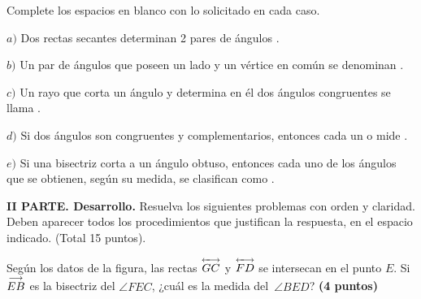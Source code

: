 \documentclass[12pt, fleqn]{article}
\begin{document}
\pagebreak

\hspace{-1cm}
\item Complete los espacios en blanco con lo solicitado en cada caso. \vs

\hspace{-1cm}
{\boldmath $a)$} Dos rectas secantes determinan 2 pares de ángulos \compl. \vs

\hspace{-1cm}
{\boldmath $b)$} Un par de ángulos que poseen un lado y un vértice en común se denominan \compl.\vs

\hspace{-1cm}
{\boldmath $c)$} Un rayo que corta un ángulo y determina en él dos ángulos congruentes se llama \compl.\vs

\hspace{-1cm}
{\boldmath $d)$} Si dos ángulos son congruentes y complementarios, entonces cada un o mide \compl.\vs

\hspace{-1cm}
{\boldmath $e)$} Si una bisectriz corta a un ángulo obtuso, entonces cada uno de los ángulos que se obtienen, según su medida, se clasifican como \compl.

\vs\vs
\eenu

{\bf II PARTE. Desarrollo.} Resuelva los siguientes problemas con orden y claridad. Deben aparecer todos los procedimientos que justifican la respuesta, en el espacio indicado. (Total 15 puntos). \vp

\benu
\item Según los datos de la figura, las rectas $\stackrel{\leftarrow\!\!\!\longrightarrow}{GC}$ y $\stackrel{\leftarrow\!\!\!\longrightarrow}{FD}$ se intersecan en el punto $E$. Si $\stackrel{\longrightarrow}{EB}$ es la bisectriz del $\angle FEC$, ¿cuál es la medida del $\,\angle BED$? \hfill{\bf (4 puntos)} \vs
\end{document}
